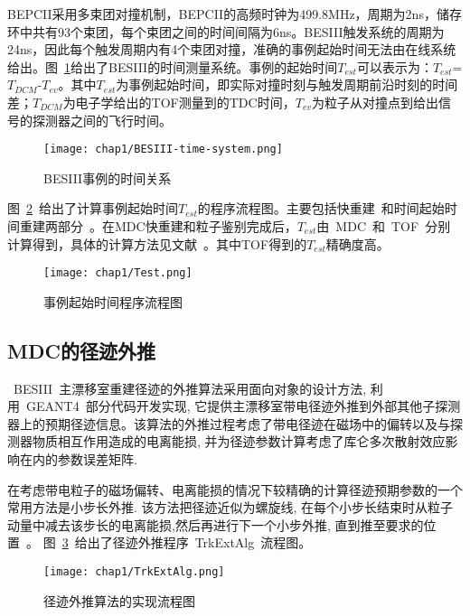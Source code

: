 BEPCII采用多束团对撞机制，BEPCII的高频时钟为499.8MHz，周期为2ns，储存环中共有93个束团，每个束团之间的时间间隔为6ns。BESIII触发系统的周期为24ns，因此每个触发周期内有4个束团对撞，准确的事例起始时间无法由在线系统给出。图~\ref{fig:BESIII-time-system}给出了BESIII的时间测量系统。事例的起始时间$T_{est}$可以表示为：$T_{est}$=$T_{DCM}$-$T_{ev}$。其中$T_{est}$为事例起始时间，即实际对撞时刻与触发周期前沿时刻的时间差；$T_{DCM}$为电子学给出的TOF测量到的TDC时间，$T_{ev}$为粒子从对撞点到给出信号的探测器之间的飞行时间。
\begin{figure}[!h]
  \centering
  \texttt{[image: chap1/BESIII-time-system.png]}
  \caption{BESIII事例的时间关系}
  \label{fig:BESIII-time-system}
\end{figure}

图~\ref{fig:Test}~给出了计算事例起始时间$T_{est}$的程序流程图。主要包括快重建~\cite{zhangxm:2005}和时间起始时间重建两部分~\cite{max:2007}。在MDC快重建和粒子鉴别完成后，$T_{est}$由~MDC~和~TOF~分别计算得到，具体的计算方法见文献~\cite{Maxiang:2008}。其中TOF得到的$T_{est}$精确度高。

\begin{figure}[!h]
  \centering
  \texttt{[image: chap1/Test.png]}
  \caption{事例起始时间程序流程图}
  \label{fig:Test}
\end{figure}
\subsection{MDC的径迹外推}

~BESIII~主漂移室重建径迹的外推算法采用面向对象的设计方法, 利用~GEANT4~部分代码开发实现, 它提供主漂移室带电径迹外推到外部其他子探测器上的预期径迹信息。该算法的外推过程考虑了带电径迹在磁场中的偏转以及与探测器物质相互作用造成的电离能损, 并为径迹参数计算考虑了库仑多次散射效应影响在内的参数误差矩阵.

在考虑带电粒子的磁场偏转、电离能损的情况下较精确的计算径迹预期参数的一个常用方法是小步长外推. 该方法把径迹近似为螺旋线, 在每个小步长结束时从粒子动量中减去该步长的电离能损,然后再进行下一个小步外推, 直到推至要求的位置~\cite{wangll:2014}。
图~\ref{fig:TrkExtAlg}~给出了径迹外推程序~TrkExtAlg~流程图。

\begin{figure}[!h]
  \centering
  \texttt{[image: chap1/TrkExtAlg.png]}
  \caption{径迹外推算法的实现流程图}
  \label{fig:TrkExtAlg}
\end{figure}

